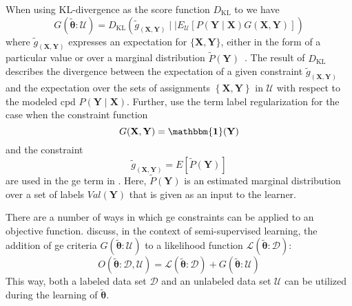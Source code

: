\bigskip

When using $\text{KL}$-divergence as the score function $D_{\text{KL}}$ to  we have~\citep{mann2010generalized}
\begin{equation}
  \label{equ:generalized-expectation-kl}
  G(\bm{\tilde{\theta}}:\mathcal{U})=D_{\text{KL}}\left(\tilde{g}_{\left(\mathbf{X},\mathbf{Y}\right)}\mid\mid E_{\mathcal{U}}\left[P(\mathbf{Y}\mid\mathbf{X})G(\mathbf{X},\mathbf{Y})\right]\right)
\end{equation}
where $\tilde{g}_{\left(\mathbf{X},\mathbf{Y}\right)}$ expresses an expectation for $\{\mathbf{X},\mathbf{Y}\}$, either in the form of a particular value or over a \gls{marginal distribution} $\tilde{P}\left(\mathbf{Y}\right)$~\citep{mann2010generalized}.
The result of $D_{\text{KL}}$ describes the divergence between the expectation of a given constraint $\tilde{g}_{\left(\mathbf{X},\mathbf{Y}\right)}$ and the expectation over the sets of assignments $\left\{\mathbf{X},\mathbf{Y}\right\}$ in $\mathcal{U}$ with respect to the modeled \gls{cpd} $P(\mathbf{Y}\mid\mathbf{X})$.
Further, \citet{mann2010generalized} use the term \gls{label regularization} for the case when the constraint function
\begin{equation}
  \label{equ:label-regularization-constraint-function}
  G(\mathbf{X},\mathbf{Y})=\mathbf{\mathbbm{1}}(\mathbf{Y})
\end{equation}
and the constraint
\begin{equation}
  \label{equ:label-regularization-constraints}
  \tilde{g}_{\left(\mathbf{X},\mathbf{Y}\right)}=E[\tilde{P}(\mathbf{Y})]
\end{equation}
are used in the \gls{ge} term in .
Here, $\tilde{P}(\mathbf{Y})$ is an estimated \gls{marginal distribution} over a set of labels $Val(\mathbf{Y})$ that is given as an input to the learner.

\bigskip

There are a number of ways in which \gls{ge} constraints can be applied to an \gls{objective function}.
\citet{mann2010generalized} discuss, in the context of semi-supervised learning, the addition of \gls{ge} criteria $G(\bm{\tilde{\theta}}:\mathcal{U})$ to a likelihood function $\mathcal{L}(\bm{\tilde{\theta}}:\mathcal{D})$:
\begin{equation}
  \label{equ:objective-function-l-g}
  O(\bm{\tilde{\theta}}:\mathcal{D},\mathcal{U})=\mathcal{L}(\bm{\tilde{\theta}}:\mathcal{D})+G(\bm{\tilde{\theta}}:\mathcal{U})
\end{equation}
This way, both a labeled data set $\mathcal{D}$ and an unlabeled data set $\mathcal{U}$ can be utilized during the learning of $\bm{\tilde{\theta}}$.

